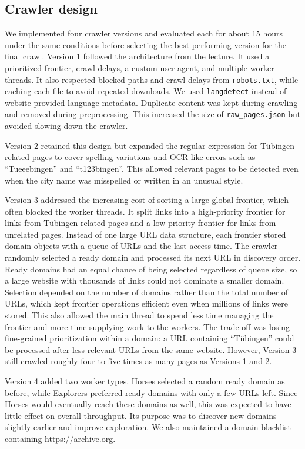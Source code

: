 \documentclass[10pt,a4paper]{article}
\begin{document}
  \subsection{Crawler design}
  We implemented four crawler versions and evaluated each for about 15 hours under the same
  conditions before selecting the best-performing version for the final crawl. Version 1 followed
  the architecture from the lecture. It used a prioritized frontier, crawl delays, a custom user
  agent, and multiple worker threads. It also respected blocked paths and crawl delays from
  \texttt{robots.txt}, while caching each file to avoid repeated downloads. We used
  \texttt{langdetect} instead of website-provided language metadata. Duplicate content was kept
  during crawling and removed during preprocessing. This increased the size of
  \texttt{raw\_pages.json} but avoided slowing down the crawler.

  Version 2 retained this design but expanded the regular expression for Tübingen-related
  pages to cover spelling variations and OCR-like errors such as ``Tueeebingen'' and
  ``t123bingen''. This allowed relevant pages to be detected even when the city name was
  misspelled or written in an unusual style.

  Version 3 addressed the increasing cost of sorting a large global frontier, which often blocked
  the worker threads. It split links into a high-priority frontier for links from Tübingen-related
  pages and a low-priority frontier for links from unrelated pages. Instead of one large URL data
  structure, each frontier stored domain objects with a queue of URLs and the last access time.
  The crawler randomly selected a ready domain and processed its next URL in discovery order.
  Ready domains had an equal chance of being selected regardless of queue size, so a large website
  with thousands of links could not dominate a smaller domain. Selection depended on the number
  of domains rather than the total number of URLs, which kept frontier operations efficient even
  when millions of links were stored. This also allowed the main thread to spend less time managing
  the frontier and more time supplying work to the workers. The trade-off was losing fine-grained
  prioritization within a domain: a URL containing ``Tübingen'' could be processed after less
  relevant URLs from the same website. However, Version 3 still crawled roughly four to five times
  as many pages as Versions 1 and 2.

  Version 4 added two worker types. Horses selected a random ready domain as before, while
  Explorers preferred ready domains with only a few URLs left. Since Horses would eventually
  reach these domains as well, this was expected to have little effect on overall throughput.
  Its purpose was to discover new domains slightly earlier and improve exploration. We also
  maintained a domain blacklist containing \href{https://archive.org}{https://archive.org}.
\end{document}
